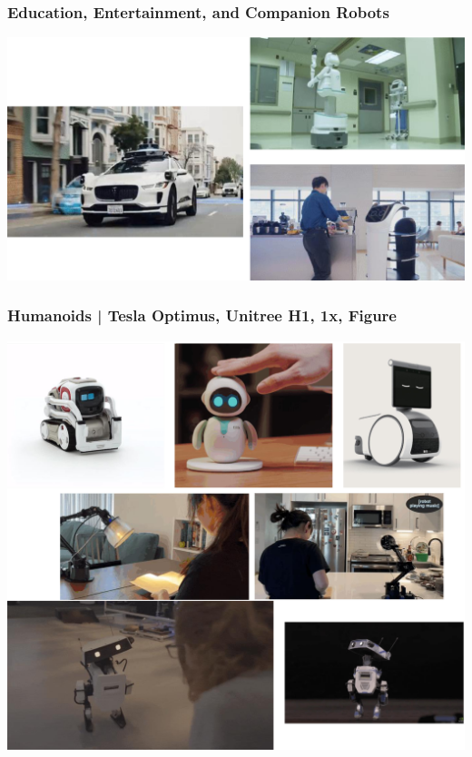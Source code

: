 \documentclass[10pt]{article}
\begin{document}
\subsubsection*{Education, Entertainment, and Companion Robots}
\begin{center} 
	\includegraphics*[width=\textwidth]{L1_7.png} 
\end{center}
\subsubsection*{Humanoids | Tesla Optimus, Unitree H1, 1x, Figure}
\begin{center} 
	\includegraphics*[width=\textwidth]{L1_8.png} 
\end{center}
\end{document}
